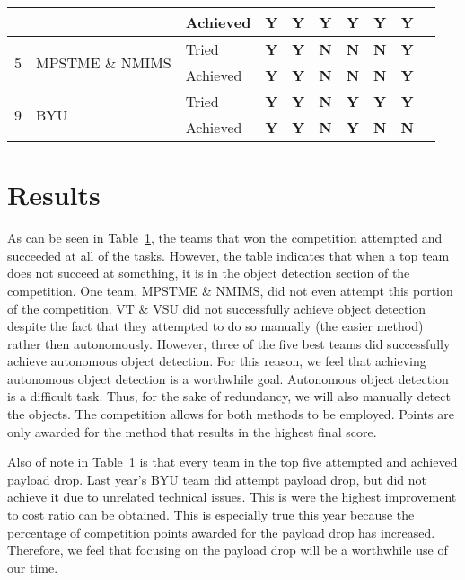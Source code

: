 \documentclass[]{auvsi_doc}
\begin{document}
\begin{artifacttable}
\begin{table}[h!]
\begin{tabular}{ cllccccccc }
							&  								& Achieved	& \color{dg}\textbf{Y} 	& \color{dg}\textbf{Y}  	& \color{dg}\textbf{Y} 	& \color{dg}\textbf{Y} 	& \color{dg}\textbf{Y}  	& \color{dg}\textbf{Y}  \\		
		\hline
		\multirow{2}{*}{5} 		& \multirow{2}{*}{MPSTME \& NMIMS} 	& Tried		& \color{dg}\textbf{Y} 	& \color{dg}\textbf{Y}  	& \color{red}\textbf{N} 	& \color{red}\textbf{N} 	& \color{red}\textbf{N}  	& \color{dg}\textbf{Y}  \\
							&  							   	& Achieved	& \color{dg}\textbf{Y} 	& \color{dg}\textbf{Y}  	& \color{red}\textbf{N} 	& \color{red}\textbf{N} 	& \color{red}\textbf{N}  	& \color{dg}\textbf{Y}  \\		
		\hline
		\multirow{2}{*}{9} 		& \multirow{2}{*}{BYU} 				& Tried		& \color{dg}\textbf{Y} 	& \color{dg}\textbf{Y}  	& \color{red}\textbf{N} 	& \color{dg}\textbf{Y} 	& \color{dg}\textbf{Y}  	& \color{dg}\textbf{Y}  \\
							&  								& Achieved	& \color{dg}\textbf{Y} 	& \color{dg}\textbf{Y}  	& \color{red}\textbf{N} 	& \color{dg}\textbf{Y} 	& \color{red}\textbf{N}  	& \color{red}\textbf{N}  \\
		\hline
	\end{tabular}
	\label{table:benchmark}
\end{table}

\section{Results}

As can be seen in Table~\ref{table:benchmark}, the teams that won the competition attempted and succeeded at all of the tasks. However, the table indicates that when a top team does not succeed at something, it is in the object detection section of the competition. One team, MPSTME \& NMIMS, did not even attempt this portion of the competition. VT \& VSU did not successfully achieve object detection despite the fact that they attempted to do so manually (the easier method) rather then autonomously. However, three of the five best teams did successfully achieve autonomous object detection. For this reason, we feel that achieving autonomous object detection is a worthwhile goal. Autonomous object detection is a difficult task. Thus, for the sake of redundancy, we will also manually detect the objects. The competition allows for both methods to be employed. Points are only awarded for the method that results in the highest final score.

Also of note in Table~\ref{table:benchmark} is that every team in the top five attempted and achieved payload drop. Last year's BYU team did attempt payload drop, but did not achieve it due to unrelated technical issues. This is were the highest improvement to cost ratio can be obtained. This is especially true this year because the percentage of competition points awarded for the payload drop has increased. Therefore, we feel that focusing on the payload drop will be a worthwhile use of our time.


\end{artifacttable}
\end{document}
